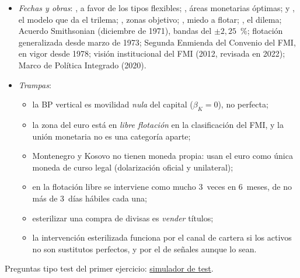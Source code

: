 \documentclass[11pt]{article}
\begin{document}
\begin{itemize}
\item \emph{Fechas y obras}: \textcite{Friedman1953Case}, a favor de los tipos flexibles; \textcite{Mundell1961Theory}, áreas monetarias óptimas; \textcite{Fleming1962Domestic} y \textcite{Mundell1963Capital}, el modelo que da el trilema; \textcite{Krugman1991Target}, zonas objetivo; \textcite{CalvoReinhart2002}, miedo a flotar; \textcite{Rey2013Dilema}, el dilema; Acuerdo Smithsonian (diciembre de 1971), bandas del $\pm2{,}25$~\%; flotación generalizada desde marzo de 1973; Segunda Enmienda del Convenio del FMI, en vigor desde 1978; visión institucional del FMI (2012, revisada en 2022); Marco de Política Integrado (2020).
\item \emph{Trampas}:
  \begin{itemize}
  \item la BP vertical es movilidad \emph{nula} del capital ($\beta_K=0$), no perfecta;
  \item la zona del euro está en \emph{libre flotación} en la clasificación del FMI, y la unión monetaria no es una categoría aparte;
  \item Montenegro y Kosovo no tienen moneda propia: usan el euro como única moneda de curso legal (dolarización oficial y unilateral);
  \item en la flotación libre se interviene como mucho 3~veces en 6~meses, de no más de 3~días hábiles cada una;
  \item esterilizar una compra de divisas es \emph{vender} títulos;
  \item la intervención esterilizada funciona por el canal de cartera si los activos no son sustitutos perfectos, y por el de señales aunque lo sean.
  \end{itemize}
\end{itemize}

\begin{anotaciones}
Preguntas tipo test del primer ejercicio: \href{https://www.victorgutierrezmarcos.es/oposicion/temario/primer-ejercicio/test/simulador.html?tema=3.B.15}{simulador de test}.
\end{anotaciones}

\bibliografia
\end{document}
